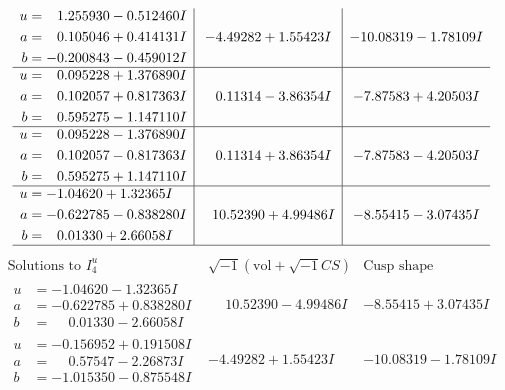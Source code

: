 \documentclass[1p]{elsarticle_modified}
\theoremstyle{definition}
\newcommand{\I}{\sqrt{-1}}
\begin{document}
$$\begin{array}{c|c|c}
\begin{aligned}
u &= \phantom{-}1.255930 - 0.512460 I \\
a &= \phantom{-}0.105046 + 0.414131 I \\
b &= -0.200843 - 0.459012 I\end{aligned}
 & -4.49282 + 1.55423 I & -10.08319 - 1.78109 I \\ \hline\begin{aligned}
u &= \phantom{-}0.095228 + 1.376890 I \\
a &= \phantom{-}0.102057 + 0.817363 I \\
b &= \phantom{-}0.595275 - 1.147110 I\end{aligned}
 & \phantom{-}0.11314 - 3.86354 I & -7.87583 + 4.20503 I \\ \hline\begin{aligned}
u &= \phantom{-}0.095228 - 1.376890 I \\
a &= \phantom{-}0.102057 - 0.817363 I \\
b &= \phantom{-}0.595275 + 1.147110 I\end{aligned}
 & \phantom{-}0.11314 + 3.86354 I & -7.87583 - 4.20503 I \\ \hline\begin{aligned}
u &= -1.04620 + 1.32365 I \\
a &= -0.622785 - 0.838280 I \\
b &= \phantom{-}0.01330 + 2.66058 I\end{aligned}
 & \phantom{-}10.52390 + 4.99486 I & -8.55415 - 3.07435 I\\
 \hline 
 \end{array}$$\newpage$$\begin{array}{c|c|c}  
\text{Solutions to }I^u_{4}& \I (\text{vol} + \sqrt{-1}CS) & \text{Cusp shape}\\
 \hline 
\begin{aligned}
u &= -1.04620 - 1.32365 I \\
a &= -0.622785 + 0.838280 I \\
b &= \phantom{-}0.01330 - 2.66058 I\end{aligned}
 & \phantom{-}10.52390 - 4.99486 I & -8.55415 + 3.07435 I \\ \hline\begin{aligned}
u &= -0.156952 + 0.191508 I \\
a &= \phantom{-}0.57547 - 2.26873 I \\
b &= -1.015350 - 0.875548 I\end{aligned}
 & -4.49282 + 1.55423 I & -10.08319 - 1.78109 I \\ \hline\begin{aligned}

\end{aligned}
\end{array}$$
\end{document}
